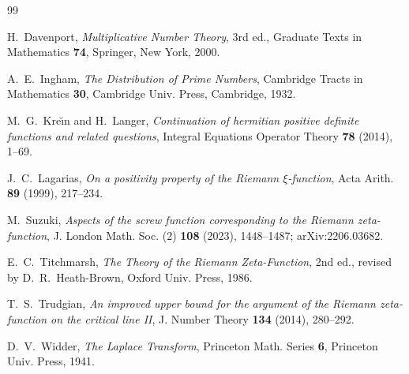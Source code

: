 \documentclass[11pt,reqno]{amsart}
\theoremstyle{plain}
\theoremstyle{definition}
\begin{document}
\begin{thebibliography}{99}

 H.~Davenport,
\emph{Multiplicative Number Theory}, 3rd ed., Graduate Texts in Mathematics \textbf{74},
Springer, New York, 2000.

 A.~E.~Ingham,
\emph{The Distribution of Prime Numbers}, Cambridge Tracts in Mathematics \textbf{30},
Cambridge Univ. Press, Cambridge, 1932.

 M.~G.~Kre\u\i n and H.~Langer,
\emph{Continuation of hermitian positive definite functions and related questions},
Integral Equations Operator Theory \textbf{78} (2014), 1--69.

 J.~C.~Lagarias,
\emph{On a positivity property of the Riemann $\xi$-function},
Acta Arith. \textbf{89} (1999), 217--234.

 M.~Suzuki,
\emph{Aspects of the screw function corresponding to the Riemann zeta-function},
J. London Math. Soc. (2) \textbf{108} (2023), 1448--1487; arXiv:2206.03682.

 E.~C.~Titchmarsh,
\emph{The Theory of the Riemann Zeta-Function}, 2nd ed., revised by D.~R.~Heath-Brown,
Oxford Univ. Press, 1986.

 T.~S.~Trudgian,
\emph{An improved upper bound for the argument of the Riemann zeta-function on the critical line II},
J. Number Theory \textbf{134} (2014), 280--292.

 D.~V.~Widder,
\emph{The Laplace Transform}, Princeton Math. Series \textbf{6}, Princeton Univ. Press, 1941.

\end{thebibliography}
\end{document}
